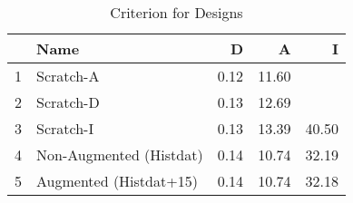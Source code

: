 \begin{table}[ht]
\centering
\caption{Criterion for Designs} 
\label{tab:criterion}
\begin{tabular}{rlrrr}
  \hline
 & Name & D & A & I \\ 
  \hline
1 & Scratch-A & 0.12 & 11.60 &  \\ 
  2 & Scratch-D & 0.13 & 12.69 &  \\ 
  3 & Scratch-I & 0.13 & 13.39 & 40.50 \\ 
  4 & Non-Augmented (Histdat) & 0.14 & 10.74 & 32.19 \\ 
  5 & Augmented (Histdat+15) & 0.14 & 10.74 & 32.18 \\ 
   \hline
\end{tabular}
\end{table}
